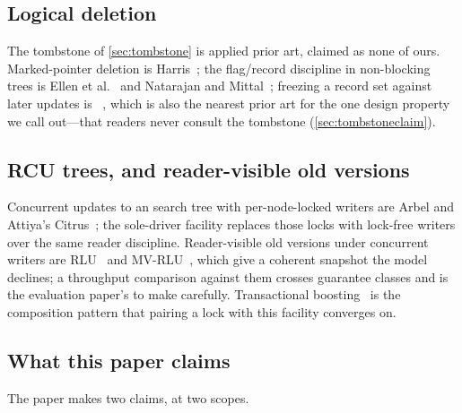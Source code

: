 \documentclass[11pt]{article}
\begin{document}
\subsection{Logical deletion}

The tombstone of \cref{sec:tombstone} is applied
prior art, claimed as none of ours. Marked-pointer deletion is
Harris~\citep{harris2001lists}; the flag/record discipline in non-blocking trees
is Ellen et al.~\citep{ellen2010nbbst} and Natarajan and
Mittal~\citep{natarajan2014bst}; freezing a record set against later updates is
~\citep{brown2013scx}, which is also the nearest prior art for the one
design property we call out---that readers never consult the tombstone
(\cref{sec:tombstoneclaim}).

\subsection{RCU trees, and reader-visible old versions}

Concurrent updates to an
\rcu search tree with per-node-locked writers are Arbel and Attiya's
Citrus~\citep{arbel2014citrus}; the sole-driver facility replaces those locks with
lock-free \mcas writers over the same \rcu reader discipline. Reader-visible old
versions under concurrent writers are RLU~\citep{matveev2015rlu} and
MV-RLU~\citep{kim2019mvrlu}, which give a coherent snapshot the \pseudotxn model
declines; a throughput comparison against them crosses guarantee classes and is
the evaluation paper's to make carefully. Transactional
boosting~\citep{herlihy2008boosting} is the composition pattern that pairing a
lock with this facility converges on.

\subsection{What this paper claims}
\label{sec:relclaims}

The paper makes two claims, at two scopes.
\end{document}
